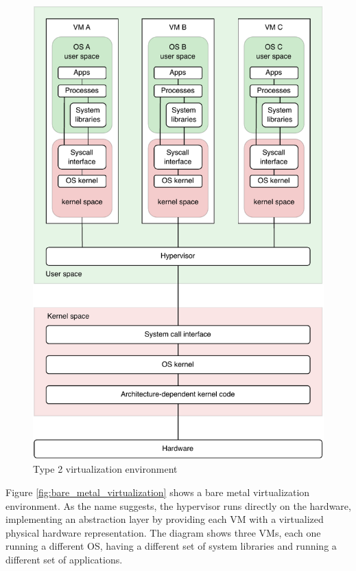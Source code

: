 \begin{figure}[htbp]
    \vspace{10pt}
    \centering
    \includegraphics{assets/type_2_virtualization.pdf}
    \caption{Type 2 virtualization environment}
    \label{fig:tipe_2_virtualization}
    \vspace{10pt}
\end{figure}

Figure \ref{fig:bare_metal_virtualization} shows a bare metal virtualization environment. As the name suggests, the hypervisor runs directly on the hardware, implementing an abstraction layer by providing each VM with a virtualized physical hardware representation.
The diagram shows three VMs, each one running a different OS, having a different set of system libraries and running a different set of applications. 

